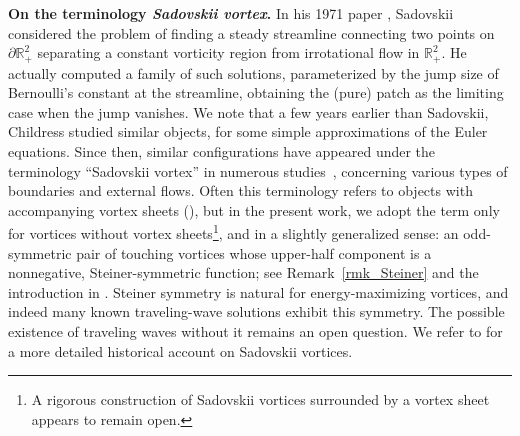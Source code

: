\documentclass[11pt]{amsart}
\theoremstyle{definition}
\theoremstyle{definition}
\numberwithin{equation}{section}
\newcommand{\0}{\emptyset}
\newcommand{\bbR}{\mathbb R}
\begin{document}
	
	\noindent\textbf{On the terminology \textit{Sadovskii vortex}.}
	In  his 1971 paper \cite{Sad1971}, Sadovskii considered the problem of finding a steady streamline connecting two points on $\partial\bbR^2_+$ separating a constant vorticity region from irrotational flow in $\bbR^2_+$.
	He actually computed a family of such solutions, parameterized by the jump size of Bernoulli's constant at the streamline, obtaining the (pure) patch as the limiting case when the jump vanishes.
	We note that a few years earlier than Sadovskii, Childress \cite{Child1966} studied similar objects, for some simple approximations of the Euler equations.
	Since then, similar configurations have appeared under the terminology ``Sadovskii vortex'' in numerous studies~\cite{Pierrehumbert1980, ST1982, MST1988, Chernyshenko1993, AZ2021, CJS2025, HT2025}, concerning various types of boundaries and external flows.
	Often this terminology refers to objects with accompanying vortex sheets (\cite{Freilich2016, FL2017}), but in the present work, we adopt the term only for vortices without vortex sheets\footnote{A rigorous construction of Sadovskii vortices surrounded by a vortex sheet  appears to remain open.}, and in a slightly generalized sense: an odd-symmetric pair of touching vortices whose upper-half component is a nonnegative, Steiner-symmetric function; see Remark~\ref{rmk_Steiner} and the introduction in \cite{CJS2025_atmos}.
	Steiner symmetry is natural for energy-maximizing vortices, and indeed many known traveling-wave solutions exhibit this symmetry.
	The possible existence of traveling waves without it remains an open question.
	We refer to \cite[Section 1.1]{CJS2025} for a more detailed historical account on Sadovskii vortices.
	
	\medskip
	
\end{document}
